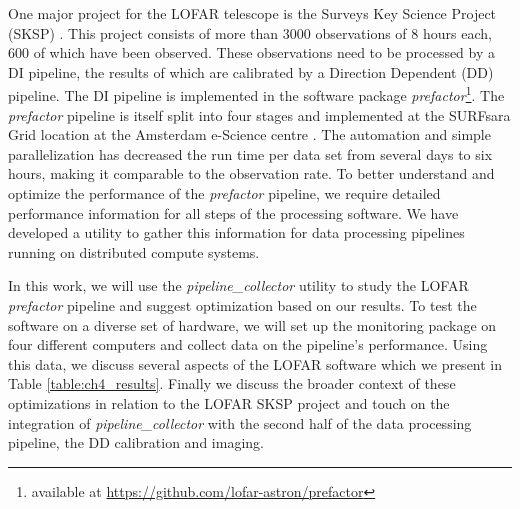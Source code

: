 One major project for the LOFAR telescope is the Surveys Key Science Project (SKSP) \citep{lotss}. This project consists of more than 3000 observations of 8 hours each, 600 of which have been observed. These observations need to be processed by a DI pipeline, the results of which are calibrated by a Direction Dependent (DD) pipeline. The DI pipeline is implemented in the software package \textit{prefactor}\footnote{available at \protect\url{https://github.com/lofar-astron/prefactor}}. The \textit{prefactor} pipeline is itself split into four stages and implemented at the SURFsara Grid location at the Amsterdam e-Science centre \citep{SurfSara,mechev17}. The automation and simple parallelization has decreased the run time per data set from several days to six hours, making it comparable to the observation rate. To better understand and optimize the performance of the \textit{prefactor} pipeline, we require detailed performance information for all steps of the processing software. We have developed a utility to gather this information for data processing pipelines running on distributed compute systems. 

In this work, we will use the \textit{pipeline\_collector} utility to study the LOFAR \textit{prefactor} pipeline and suggest optimization based on our results. To test the software on a diverse set of hardware, we will set up the monitoring package on four different computers and collect data on the pipeline's performance. Using this data, we discuss several aspects of the LOFAR software which we present in Table \ref{table:ch4_results}. Finally we discuss the broader context of these optimizations in relation to the LOFAR SKSP project and touch on the integration of \textit{pipeline\_collector} with the second half of the data processing pipeline, the DD calibration and imaging. 
    
